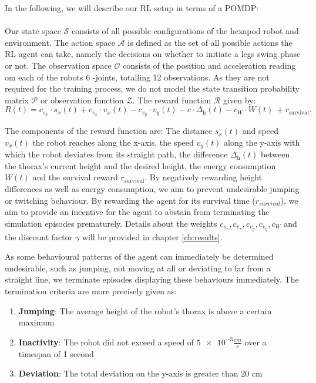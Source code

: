 In the following, we will describe our RL setup in terms of a POMDP:\\ \\
Our state space $\mathcal{S}$ consists of all possible configurations of the hexapod robot and environment.
The action space $\mathcal{A}$ is defined as the set of all possible actions the RL agent can take, namely the decisions on whether to initiate a legs swing phase or not.
The observation space $\mathcal{O}$ consists of the position and acceleration reading om each of the robots 6 \textalpha-joints, totalling 12 observations.
As they are not required for the training process, we do not model the state transition probability matrix $\mathcal{P}$ or observation function $\mathcal{Z}$.
The reward function $\mathcal{R}$ given by:
 \[
 R(t) = c_{s_x} \cdot s_x(t) + c_{v_x} \cdot v_x(t) - c_{v_y} \cdot v_y(t) - c \cdot \Delta_\text{h}(t) - c_{W} \cdot W(t) \ + r_\text{survival}.
 \]
 
The components of the reward function are:
The distance $s_x(t)$ and speed $v_x(t)$ the robot reaches along the x-axis, the speed $v_y(t)$ along the y-axis with which the robot deviates from its straight path, the difference $\Delta_\text{h}(t)$ between the thorax's current height and the desired height, the energy consumption $W(t)$ and the survival reward $r_\text{survival}$.
By negatively rewarding height differences as well as energy consumption, we aim to prevent undesirable jumping or twitching behaviour.
By rewarding the agent for its survival time ($r_{survival}$), we aim to provide an incentive for the agent to abstain from terminating the simulation episodes prematurely.
Details about the weights $c_{s_x}, c_{v_x}, c_{v_y}, c_{v_y}, c_{W}$ and the discount factor $\gamma$ will be provided in chapter \ref{ch:results}.

As some behavioural patterns of the agent can immediately be determined undesirable, such as jumping, not moving at all or deviating to far from a straight line, we terminate episodes displaying these behaviours immediately.
The termination criteria are more precisely given as:
\begin{enumerate}
	\item \textbf{Jumping}: The average height of the robot's thorax is above a certain maximum
	\item \textbf{Inactivity}: The robot did not exceed a speed of $\num{5e-3}\frac{cm}{s}$ over a timespan of 1 second
	\item \textbf{Deviation}: The total deviation on the y-axis is greater than 20 cm
\end{enumerate}


